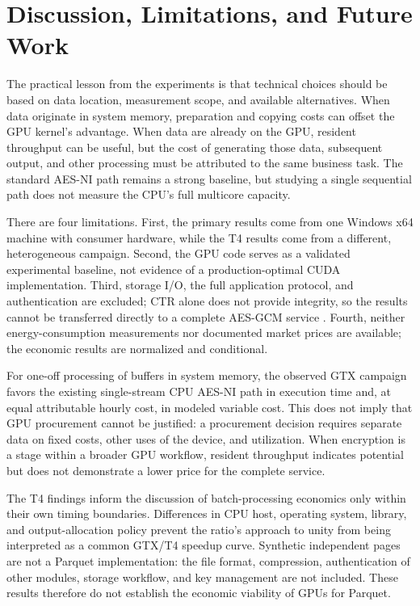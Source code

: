 \documentclass[11pt,b5paper]{article}
\begin{document}
\section{Discussion, Limitations, and Future Work}
The practical lesson from the experiments is that technical choices should be based on data location, measurement scope, and available alternatives. When data originate in system memory, preparation and copying costs can offset the GPU kernel's advantage. When data are already on the GPU, resident throughput can be useful, but the cost of generating those data, subsequent output, and other processing must be attributed to the same business task. The standard AES-NI path remains a strong baseline, but studying a single sequential path does not measure the CPU's full multicore capacity.\par
There are four limitations. First, the primary results come from one Windows x64 machine with consumer hardware, while the T4 results come from a different, heterogeneous campaign. Second, the GPU code serves as a validated experimental baseline, not evidence of a production-optimal CUDA implementation. Third, storage I/O, the full application protocol, and authentication are excluded; CTR alone does not provide integrity, so the results cannot be transferred directly to a complete AES-GCM service \citep{nist_gcm2007}. Fourth, neither energy-consumption measurements nor documented market prices are available; the economic results are normalized and conditional.\par
For one-off processing of buffers in system memory, the observed GTX campaign favors the existing single-stream CPU AES-NI path in execution time and, at equal attributable hourly cost, in modeled variable cost. This does not imply that GPU procurement cannot be justified: a procurement decision requires separate data on fixed costs, other uses of the device, and utilization. When encryption is a stage within a broader GPU workflow, resident throughput indicates potential but does not demonstrate a lower price for the complete service.\par
The T4 findings inform the discussion of batch-processing economics only within their own timing boundaries. Differences in CPU host, operating system, library, and output-allocation policy prevent the ratio's approach to unity from being interpreted as a common GTX/T4 speedup curve. Synthetic independent pages are not a Parquet implementation: the file format, compression, authentication of other modules, storage workflow, and key management are not included. These results therefore do not establish the economic viability of GPUs for Parquet.\par
\end{document}
